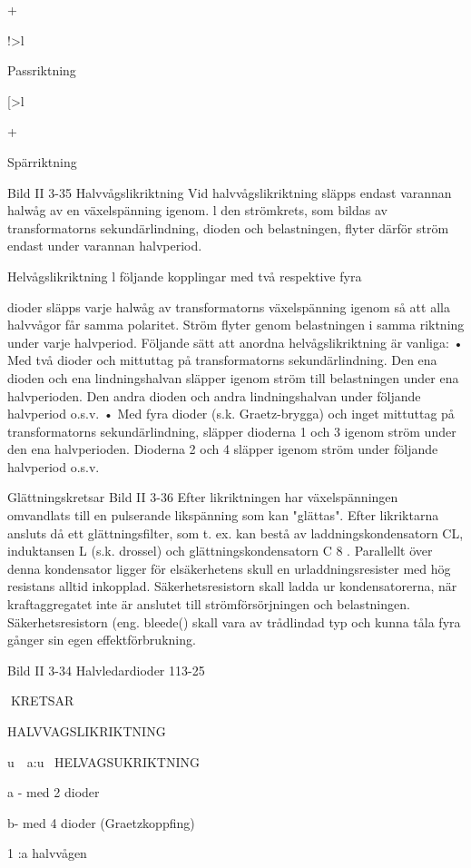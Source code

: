 {{{+

!>l

Passriktning

[>l

+

Spärriktning

Bild II 3-35
Halvvågslikriktning
Vid halvvågslikriktning släpps endast varannan halwåg av en växelspänning igenom. l
den strömkrets, som bildas av transformatorns sekundärlindning, dioden och belastningen, flyter därför ström endast under
varannan halvperiod.

Helvågslikriktning
l följande kopplingar med två respektive fyra

dioder släpps varje halwåg av transformatorns växelspänning igenom så att alla halvvågor får samma polaritet. Ström flyter genom belastningen i samma riktning under
varje halvperiod. Följande sätt att anordna
helvågslikriktning är vanliga:
• Med två dioder och mittuttag på transformatorns sekundärlindning. Den ena dioden och ena lindningshalvan släpper igenom ström till belastningen under ena halvperioden. Den andra dioden och andra
lindningshalvan under följande halvperiod
o.s.v.
• Med fyra dioder (s.k. Graetz-brygga) och
inget mittuttag på transformatorns sekundärlindning, släpper dioderna 1 och 3 igenom ström under den ena halvperioden.
Dioderna 2 och 4 släpper igenom ström
under följande halvperiod o.s.v.

Glättningskretsar
Bild II 3-36
Efter likriktningen har växelspänningen omvandlats till en pulserande likspänning som
kan "glättas". Efter likriktarna ansluts då ett
glättningsfilter, som t. ex. kan bestå av laddningskondensatorn CL, induktansen L (s.k.
drossel) och glättningskondensatorn C 8 .
Parallellt över denna kondensator ligger för
elsäkerhetens skull en urladdningsresister
med hög resistans alltid inkopplad.
Säkerhetsresistorn skall ladda ur kondensatorerna, när kraftaggregatet inte är
anslutet till strömförsörjningen och belastningen. Säkerhetsresistorn (eng. bleede()
skall vara av trådlindad typ och kunna tåla
fyra gånger sin egen effektförbrukning.

Bild II 3-34 Halvledardioder
113-25

KRETSAR

HALVVAGSLIKRIKTNING

u~~a:u~
HELVAGSUKRIKTNING

a - med 2 dioder

b- med 4 dioder
(Graetzkoppfing)

1 :a halvvågen

}}}
